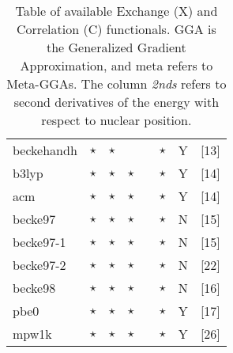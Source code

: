 \begin{table}[htp]
\begin{tabular}{|l|cccccc|r|}
\hline
beckehandh & $\star$  &   $\star$   &           &   & $\star$  &  Y   &[13]\\
b3lyp      & $\star$  &   $\star$   &  $\star$  &   & $\star$  &  Y   &[14]\\
acm        & $\star$  &   $\star$   &  $\star$  &   & $\star$  &  Y   &[14]\\
becke97    & $\star$  &   $\star$   &  $\star$  &   & $\star$  &  N   &[15]\\
becke97-1  & $\star$  &   $\star$   &  $\star$  &   & $\star$  &  N   &[15]\\
becke97-2  & $\star$  &   $\star$   &  $\star$  &   & $\star$  &  N   &[22]\\
becke98    & $\star$  &   $\star$   &  $\star$  &   & $\star$  &  N   &[16]\\
pbe0       & $\star$  &   $\star$   &  $\star$  &   & $\star$  &  Y   &[17]\\
mpw1k      & $\star$  &   $\star$   &  $\star$  &   & $\star$  &  Y   &[26]\\
\hline
\end{tabular}
\caption{Table of available Exchange (X) and Correlation (C) functionals.
GGA is the Generalized Gradient Approximation, and meta refers to
Meta-GGAs. The column {\em 2nds} refers to second derivatives of the
energy with respect to nuclear position. }
\label{tablexc}
\end{table}




